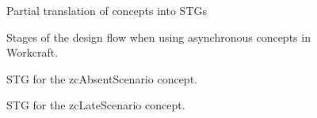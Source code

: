 \documentclass[british, journal]{IEEEtran}
\begin{document}
\begin{figure}[H]
%								
%			
		\protect\caption{\label{fig:IndividConceptStgs}Partial translation of concepts into STGs}
\end{figure}

\begin{figure}[H]
	\begin{centering}
		\par\end{centering}
	
		\protect\caption{\label{fig:workcraft_screenshot}Stages of the design flow when using asynchronous concepts in Workcraft.}
\end{figure}

\begin{figure}[H]
	\begin{centering}
		\par\end{centering}
		\protect\caption{\label{fig:zcAbsentScenario STG} STG for the \textsf{zcAbsentScenario} concept.}
\end{figure}

\begin{figure}[H]
	\begin{centering}
		\par\end{centering}
		\protect\caption{\label{fig:zcLateScenario STG}STG for the \textsf{zcLateScenario} concept.}
\end{figure}
\end{document}
